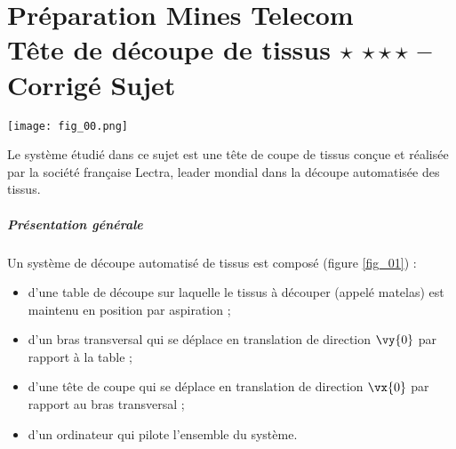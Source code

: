\chapter*{Préparation Mines Telecom \\%
Tête de découpe de tissus \ifnormal $\star$ \else \fi \iftdifficile $\star\star\star$ \else \fi  -- 
\ifprof Corrigé \else Sujet \fi}

\iflivret {} \else
\ifprof  {} \else \fi
\fi

\setcounter{question}{0}
\marginnote{
\UPSTIcompetence[2]{}
}


\begin{marginfigure}
\texttt{[image: fig\_00.png]}
\end{marginfigure}


Le système étudié dans ce sujet est une tête de coupe de tissus conçue et réalisée par la société française Lectra, leader mondial dans la découpe automatisée des tissus.

\paragraph*{Présentation générale}

Un système de découpe automatisé de tissus est composé (figure \ref{fig_01}) :
\begin{itemize}
\item d’une table de découpe sur laquelle le tissus à découper (appelé matelas) est maintenu en position par aspiration ;
\item d’un bras transversal qui se déplace en translation de direction $\vy{0}$ par rapport à la table ;
\item d’une tête de coupe qui se déplace en translation de direction $\vx{0}$ par rapport au bras transversal ;
\item d’un ordinateur qui pilote l’ensemble du système.	 
\end{itemize}

